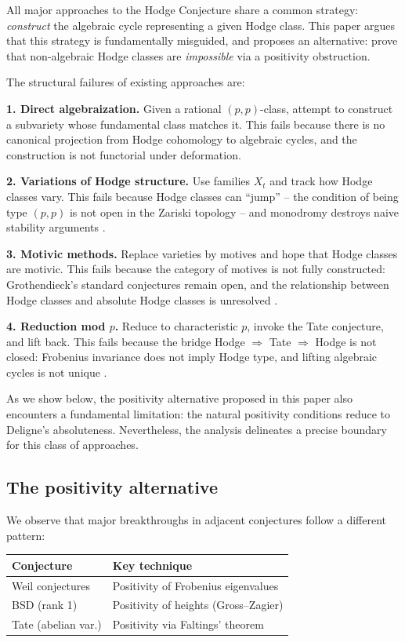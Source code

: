 \documentclass[aps,prd,twocolumn,superscriptaddress,nofootinbib]{revtex4-2}
\theoremstyle{definition}
\theoremstyle{remark}
\begin{document}
All major approaches to the Hodge Conjecture share a common strategy: \textit{construct} the algebraic cycle representing a given Hodge class. This paper argues that this strategy is fundamentally misguided, and proposes an alternative: prove that non-algebraic Hodge classes are \textit{impossible} via a positivity obstruction.

The structural failures of existing approaches are:

\textbf{1. Direct algebraization.} Given a rational $(p,p)$-class, attempt to construct a subvariety whose fundamental class matches it. This fails because there is no canonical projection from Hodge cohomology to algebraic cycles, and the construction is not functorial under deformation.

\textbf{2. Variations of Hodge structure.} Use families $X_t$ and track how Hodge classes vary. This fails because Hodge classes can ``jump'' -- the condition of being type $(p,p)$ is not open in the Zariski topology -- and monodromy destroys naive stability arguments \cite{Voisin2002}.

\textbf{3. Motivic methods.} Replace varieties by motives and hope that Hodge classes are motivic. This fails because the category of motives is not fully constructed: Grothendieck's standard conjectures \cite{Grothendieck1969} remain open, and the relationship between Hodge classes and absolute Hodge classes is unresolved \cite{Andre1996}.

\textbf{4. Reduction mod $p$.} Reduce to characteristic $p$, invoke the Tate conjecture, and lift back. This fails because the bridge Hodge $\Rightarrow$ Tate $\Rightarrow$ Hodge is not closed: Frobenius invariance does not imply Hodge type, and lifting algebraic cycles is not unique \cite{Charles2013}.

As we show below, the positivity alternative proposed in this paper also encounters a fundamental limitation: the natural positivity conditions reduce to Deligne's absoluteness. Nevertheless, the analysis delineates a precise boundary for this class of approaches.

\subsection{The positivity alternative}

We observe that major breakthroughs in adjacent conjectures follow a different pattern:

\begin{center}
\begin{tabular}{ll}
\hline
Conjecture & Key technique \\
\hline
Weil conjectures & Positivity of Frobenius eigenvalues \\
BSD (rank 1) & Positivity of heights (Gross--Zagier) \\
Tate (abelian var.) & Positivity via Faltings' theorem \\
\hline
\end{tabular}
\end{center}
\end{document}
